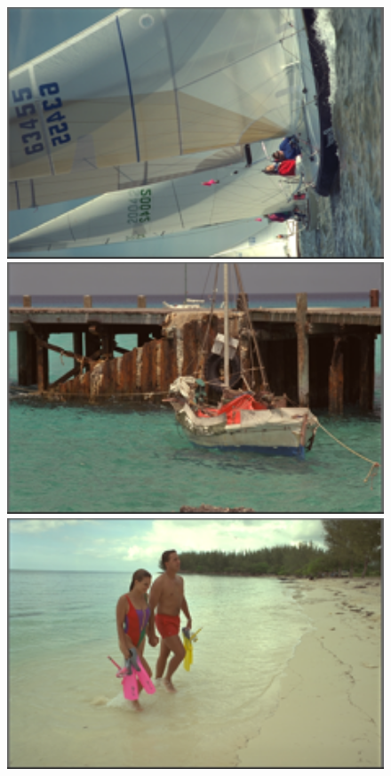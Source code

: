\documentclass[10pt,twocolumn,letterpaper,sort&compress]{article}
\begin{document}
\begin{figure}
{\begin{minipage}{0.075\textwidth}
\end{minipage}
\begin{minipage}{0.075\textwidth}
\includegraphics[width=1\textwidth]{24images/resize_kodim10.png}
\end{minipage}
\begin{minipage}{0.075\textwidth}
\includegraphics[width=1\textwidth]{24images/resize_kodim11.png}
\end{minipage}
\begin{minipage}{0.075\textwidth}
\includegraphics[width=1\textwidth]{24images/resize_kodim12.png}

\end{minipage}}
\end{figure}
\end{document}
